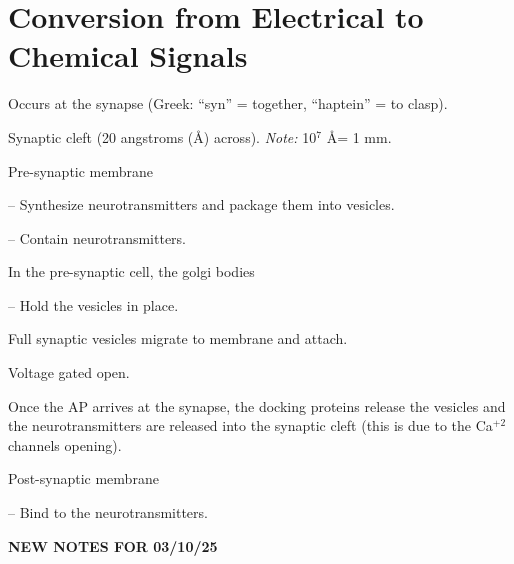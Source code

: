 \section{Conversion from Electrical to Chemical Signals}

\begin{coloredlist}
    \item Occurs at the synapse (Greek: ``syn'' = together, ``haptein'' = to clasp).
    \begin{coloredlist}
        \item Synaptic cleft (20 angstroms (\AA) across). \textit{Note:} 10\(^7\) \AA = 1 mm.
        \item Pre-synaptic membrane
        \begin{coloredlist}
            \item {} -- Synthesize neurotransmitters and package them into vesicles.
            \item {} -- Contain neurotransmitters.
            \begin{coloredlist}
                \item In the pre-synaptic cell, the golgi bodies 
            \end{coloredlist}
            \item {} -- Hold the vesicles in place.
            \begin{coloredlist}
                \item Full synaptic vesicles migrate to membrane and attach.
            \end{coloredlist}
            \item Voltage gated  open.
            \item Once the AP arrives at the synapse, the docking proteins release the vesicles and the neurotransmitters are released into the synaptic cleft (this is due to the Ca\(^{+2}\) channels opening).
        \end{coloredlist}
        \item Post-synaptic membrane
        \begin{coloredlist}
            \item {} -- Bind to the neurotransmitters.
        \end{coloredlist}
    \end{coloredlist}
\end{coloredlist}
\newpage
\begin{center}
    \textbf{NEW NOTES FOR 03/10/25} \\
    \hrulefill
\end{center}

